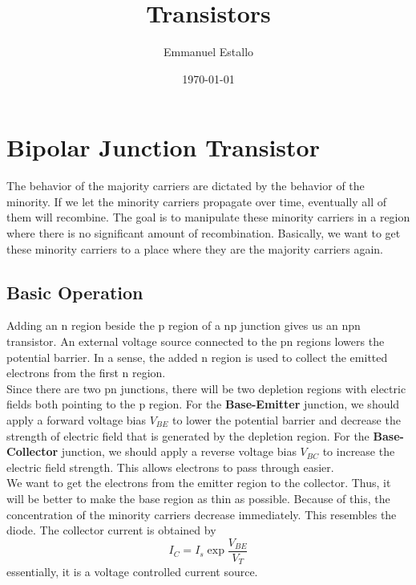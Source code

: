 \documentclass{article}
\title{Transistors}
\author{Emmanuel Estallo}
\date{\today}
\begin{document}
\boldmath 
\maketitle 

\section{Bipolar Junction Transistor}
\noindent 
The behavior of the majority carriers are dictated by the behavior of the minority.
If we let the minority carriers propagate over time, eventually all of them will 
recombine. The goal is to manipulate these minority carriers in a region where there 
is no significant amount of recombination. Basically, we want to get these minority 
carriers to a place where they are the majority carriers again. 

\subsection{Basic Operation}
\noindent 
Adding an n region beside the p region of a np junction gives us an npn transistor.
An external voltage source connected to the pn regions lowers the potential barrier.
In a sense, the added n region is used to collect the emitted electrons from the first 
n region. 
\vspace{8pt}
\\ Since there are two pn junctions, there will be two depletion regions with electric
fields both pointing to the p region. For the \textbf{Base-Emitter} junction, we should 
apply a forward voltage bias $V_{BE}$ to lower the potential barrier and decrease the 
strength of electric field that is generated by the depletion region. For the 
\textbf{Base-Collector} junction, we should apply a reverse voltage bias $V_{BC}$ 
to increase the electric field strength. This allows electrons to pass through easier. 
\vspace{8pt}
\\ We want to get the electrons from the emitter region to the collector. Thus, it will
be better to make the base region as thin as possible. Because of this, the 
concentration of the minority carriers decrease immediately. This resembles the diode.
The collector current is obtained by 
$$I_{C}=I_{s}\exp{\frac{V_{BE}}{V_{T}}}$$
essentially, it is a voltage controlled current source. 
 
\end{document}
